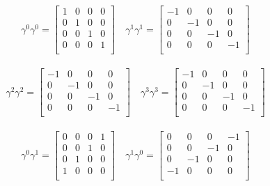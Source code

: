 \documentclass{article}
\begin{document}
\begin{align*}
\gamma^0 \gamma^0 = \begin{bmatrix}
 1  &  0  &  0  &  0  \\
 0  &  1  &  0  &  0  \\
 0  &  0  &  1  &  0  \\
 0  &  0  &  0  &  1  \\
\end{bmatrix} \quad
\gamma^1 \gamma^1 = \begin{bmatrix}
 -1  &  0  &  0  &  0  \\
 0  &  -1  &  0  &  0  \\
 0  &  0  &  -1  &  0  \\
 0  &  0  &  0  &  -1  \\
\end{bmatrix}
\end{align*}

\begin{align*}
\gamma^2 \gamma^2 = \begin{bmatrix}
 -1  &  0  &  0  &  0  \\
 0  &  -1  &  0  &  0  \\
 0  &  0  &  -1  &  0  \\
 0  &  0  &  0  &  -1  \\
\end{bmatrix} \quad
\gamma^3 \gamma^3 = \begin{bmatrix}
 -1  &  0  &  0  &  0  \\
 0  &  -1  &  0  &  0  \\
 0  &  0  &  -1  &  0  \\
 0  &  0  &  0  &  -1  \\
\end{bmatrix}
\end{align*}

\begin{align*}
\gamma^0 \gamma^1 = \begin{bmatrix}
 0  &  0  &  0  &  1  \\
 0  &  0  &  1  &  0  \\
 0  &  1  &  0  &  0  \\
 1  &  0  &  0  &  0  \\
\end{bmatrix} \quad
\gamma^1 \gamma^0 = \begin{bmatrix}
 0  &  0  &  0  &  -1  \\
 0  &  0  &  -1  &  0  \\
 0  &  -1  &  0  &  0  \\
 -1  &  0  &  0  &  0  \\
\end{bmatrix}
\end{align*}
\end{document}
